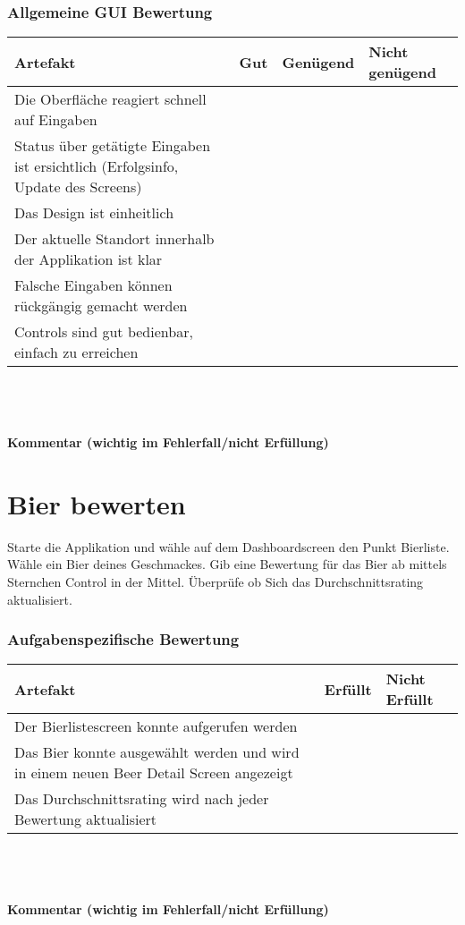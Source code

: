 \documentclass[10pt,a4paper]{scrartcl}
\begin{document}
\subsubsection*{Allgemeine GUI Bewertung}
\begin{tabular}{|p{}|p{}|p{}|p{}|}
\hline 
\rule[-1ex]{0pt}{2.5ex} \textbf{Artefakt} & \textbf{Gut} & \textbf{Genügend} & \textbf{Nicht genügend} \\ 
\hline 
\rule[-1ex]{0pt}{2.5ex} Die Oberfläche reagiert schnell auf Eingaben &  &  &  \\ 
\hline 
\rule[-1ex]{0pt}{2.5ex} Status über getätigte Eingaben ist ersichtlich (Erfolgsinfo, Update des Screens) &  &  &  \\ 
\hline 
\rule[-1ex]{0pt}{2.5ex} Das Design ist einheitlich &  &  &  \\ 
\hline 
\rule[-1ex]{0pt}{2.5ex} Der aktuelle Standort innerhalb der Applikation ist klar &  &  &  \\ 
\hline 
\rule[-1ex]{0pt}{2.5ex} Falsche Eingaben können rückgängig gemacht werden &  &  &  \\ 
\hline 
\rule[-1ex]{0pt}{2.5ex} Controls sind gut bedienbar, einfach zu erreichen &  &  &  \\  
\hline 
\end{tabular} 
\\
\\
\\
\textbf{Kommentar (wichtig im Fehlerfall/nicht Erfüllung)}
\vspace*{4cm}

\section{Bier bewerten}
Starte die Applikation und wähle auf dem Dashboardscreen den Punkt Bierliste. Wähle ein Bier deines Geschmackes. Gib eine Bewertung für das Bier ab mittels Sternchen Control in der Mittel. Überprüfe ob Sich das Durchschnittsrating aktualisiert.

\subsubsection*{Aufgabenspezifische Bewertung}
\begin{tabular}{|p{}|p{}|p{}|}
\hline 
\textbf{Artefakt} & \textbf{Erfüllt} & \textbf{Nicht Erfüllt} \\ 
\hline 
Der Bierlistescreen konnte aufgerufen werden &  &  \\ 
\hline 
Das Bier konnte ausgewählt werden und wird in einem neuen Beer Detail Screen angezeigt &  &  \\ 
\hline 
Das Durchschnittsrating wird nach jeder Bewertung aktualisiert &  &  \\ 
\hline 
\end{tabular}
\\
\\
\\
\textbf{Kommentar (wichtig im Fehlerfall/nicht Erfüllung)}
\vspace*{4cm}
\end{document}
